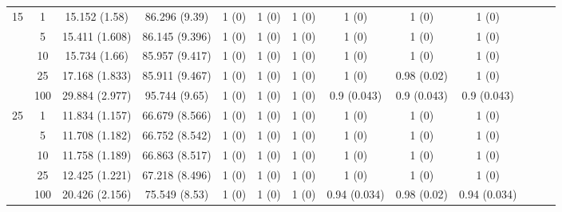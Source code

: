 \documentclass[10pt]{article}
\theoremstyle{definition}
\begin{document}
\begin{sidewaysfigure}
\begin{tabular}{cc|cc|ccc|ccc|ccc}
    \multirow{5}{*}{15}  & 1  & 15.152 (1.58) & 86.296 (9.39) & 1 (0) & 1 (0) & 1 (0) & 1 (0) & 1 (0) & 1 (0) \\ 
 & 5  & 15.411 (1.608) & 86.145 (9.396) & 1 (0) & 1 (0) & 1 (0) & 1 (0) & 1 (0) & 1 (0) \\ 
& 10  & 15.734 (1.66) & 85.957 (9.417) & 1 (0) & 1 (0) & 1 (0) & 1 (0) & 1 (0) & 1 (0) \\ 
 & 25  & 17.168 (1.833) & 85.911 (9.467) & 1 (0) & 1 (0) & 1 (0) & 1 (0) & 0.98 (0.02) & 1 (0) \\ 
  & 100  & 29.884 (2.977) & 95.744 (9.65) & 1 (0) & 1 (0) & 1 (0) & 0.9 (0.043) & 0.9 (0.043) & 0.9 (0.043) \\[.3cm]  
    \multirow{5}{*}{25}  & 1  & 11.834 (1.157) & 66.679 (8.566) & 1 (0) & 1 (0) & 1 (0) & 1 (0) & 1 (0) & 1 (0) \\ 
  & 5  & 11.708 (1.182) & 66.752 (8.542) & 1 (0) & 1 (0) & 1 (0) & 1 (0) & 1 (0) & 1 (0) \\ 
 & 10  & 11.758 (1.189) & 66.863 (8.517) & 1 (0) & 1 (0) & 1 (0) & 1 (0) & 1 (0) & 1 (0) \\ 
  & 25  & 12.425 (1.221) & 67.218 (8.496) & 1 (0) & 1 (0) & 1 (0) & 1 (0) & 1 (0) & 1 (0) \\ 
 & 100  & 20.426 (2.156) & 75.549 (8.53) & 1 (0) & 1 (0) & 1 (0) & 0.94 (0.034) & 0.98 (0.02) & 0.94 (0.034) \\ 
\end{tabular}
\end{sidewaysfigure}






\end{document}
